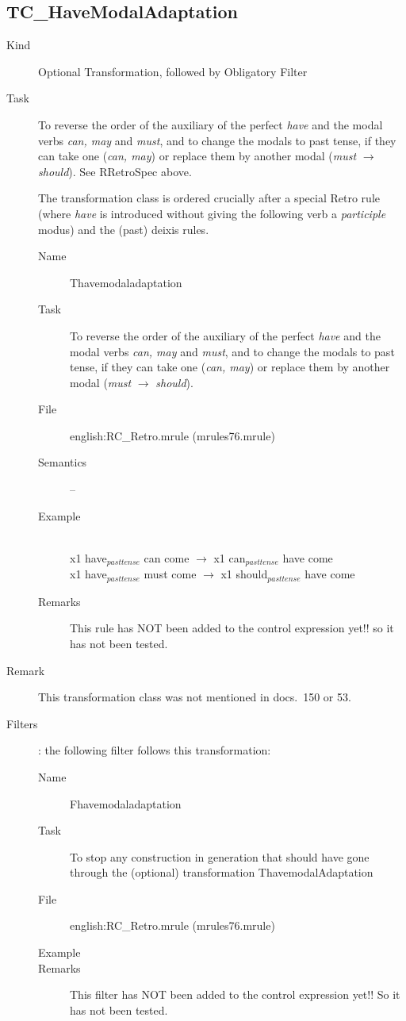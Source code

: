 \newpage
\subsection{TC\_HaveModalAdaptation}

\begin{description}
\item[Kind] Optional Transformation, followed by Obligatory Filter
\item[Task] To reverse the order of the auxiliary of the perfect {\em have\/} 
and the modal verbs {\em can, may\/} and {\em must\/}, and to change the modals 
to past tense, if they can take one ({\em can, may\/}) or replace them by 
another modal ({\em must\/} $\rightarrow$ {\em should\/}). See RRetroSpec above.

The transformation class is ordered crucially after a special Retro rule (where 
{\em have\/} is introduced without giving the following verb a {\em participle
\/} modus) and the (past) deixis rules.

\vspace{1 cm}
\begin{description}
\item[Name] Thavemodaladaptation
\item[Task] To reverse the order of the auxiliary of the perfect {\em have\/} 
and the modal verbs {\em can, may\/} and {\em must\/}, and to change the modals 
to past tense, if they can take one ({\em can, may\/}) or replace them by 
another modal ({\em must\/} $\rightarrow$ {\em should\/}). 
\item[File] english:RC\_Retro.mrule (mrules76.mrule)
\item[Semantics] --
\item[Example] \mbox{}\\
x1 have$_{pasttense}$ can come $\rightarrow$ x1 can$_{pasttense}$ have come \\
x1 have$_{pasttense}$ must come $\rightarrow$ x1 should$_{pasttense}$ have come 
\item[Remarks] This rule has NOT been added to the control expression yet!!
so it has not been tested.
\end{description}

\item[Remark] This transformation class was not mentioned in docs.\ 150 or 53.
\item[Filters]: the following filter follows this transformation:

\vspace{1 cm}
\begin{description}
\item[Name] Fhavemodaladaptation
\item[Task] To stop any construction in generation that should have gone 
through the (optional) transformation ThavemodalAdaptation
\item[File] english:RC\_Retro.mrule (mrules76.mrule)
\item[Example] 
\item[Remarks] This filter has NOT been added to the control expression yet!!
So it has not been tested.
\end{description}


\end{description}

